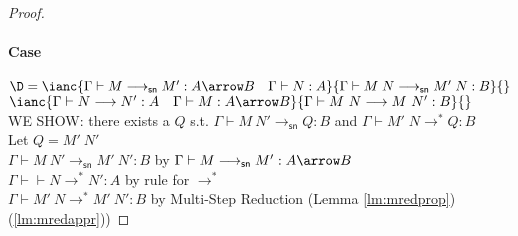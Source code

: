 \documentclass{article}
\newcommand{\csn}{\mathsf{sn}}
\newcommand{\mred}{\longrightarrow^*}
\newcommand{\red}{\longrightarrow}
\newcommand{\redsn}{\longrightarrow_\csn}
\begin{document}
\begin{proof}
\paragraph{Case}
$\D  = \ianc{\Gamma \vdash M \redsn M' : A \arrow B \quad \Gamma \vdash N : A}
            {\Gamma \vdash M\;N \redsn M'\;N : B}{}$
\qquad
$\ianc {\Gamma \vdash N\red N' : A  \quad \Gamma \vdash M : A \arrow B}
       {\Gamma \vdash M~N  \red M~N' : B }{}$
\\[1em]
WE SHOW: there exists a $Q$ s.t. $\Gamma \vdash M~N' \redsn Q : B$ and $\Gamma \vdash M'\;N \mred Q : B$
\\[0.5em]
Let $Q = M'~N'$ \\[0.5em]
$\Gamma \vdash M~N' \redsn M'~N' : B$ \hfill by $\Gamma \vdash M \redsn M' : A \arrow B$ \\
$\Gamma \vdash \vdash N\mred N' : A$ \hfill by rule for $\mred$\\
$\Gamma \vdash M'~N \mred M'~N' : B$ \hfill by Multi-Step Reduction (Lemma \ref{lm:mredprop})(\ref{lm:mredappr}))

\end{proof}
\end{document}
